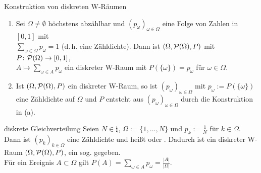 \begin{Satz}{Konstruktion von diskreten W-Räumen}
    \begin{enumerate}
        \item
        Sei $\Omega \not= \emptyset$ höchstens abzählbar und $(p_\omega)_{\omega \in \Omega}$
        eine Folge von Zahlen in $[0, 1]$ mit\\
        $\sum_{\omega \in \Omega} p_\omega = 1$ (d.\,h. eine Zähldichte).
        Dann ist $(\Omega, \P(\Omega), P)$ mit $P\colon \P(\Omega) \rightarrow [0, 1]$,\\
        $A \mapsto \sum_{\omega \in A} p_\omega$ ein diskreter W-Raum mit
        $P(\{\omega\}) = p_\omega$ für $\omega \in \Omega$.
        
        \item
        Ist $(\Omega, \P(\Omega), P)$ ein diskreter W-Raum, so ist $(p_\omega)_{\omega \in \Omega}$
        mit $p_\omega := P(\{\omega\})$ eine Zähldichte
        auf $\Omega$ und $P$ entsteht aus $(p_\omega)_{\omega \in \Omega}$ durch die Konstruktion
        in (a).
    \end{enumerate}
\end{Satz}

\linie
\pagebreak

\begin{Def}{diskrete Gleichverteilung}
    Seien $N \in \natural$, $\Omega := \{1, \dotsc, N\}$ und $p_k := \frac{1}{N}$
    für $k \in \Omega$.
    Dann ist $(p_k)_{k \in \Omega}$ eine Zähldichte und heißt  oder
    .
    Dadurch ist ein diskreter W-Raum $(\Omega, \P(\Omega), P)$, ein sog.
     gegeben.\\
    Für ein Ereignis $A \subset \Omega$ gilt
    $P(A) = \sum_{\omega \in A} p_\omega = \frac{|A|}{|\Omega|}$.
\end{Def}

